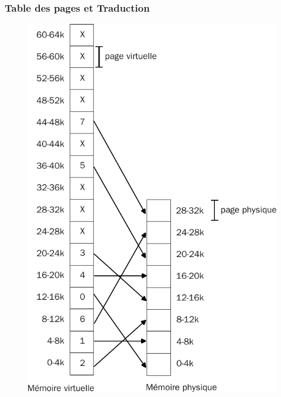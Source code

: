 \documentclass[8pt]{beamer}
\begin{document}
\begin{frame}
    \frametitle{Table des pages et Traduction}
    \begin{figure}
        \begin{minipage}[b]{0.45\linewidth}
            \centering

            \includegraphics[width=.75\linewidth]{figures/memoire_virtuelle_physique_T.pdf}
            \subcaption{}
            \label{fig:page_table}
        \end{minipage}
        \begin{minipage}[b]{0.5\linewidth}
            \centering

\end{minipage}
\end{figure}
\end{frame}
\end{document}
